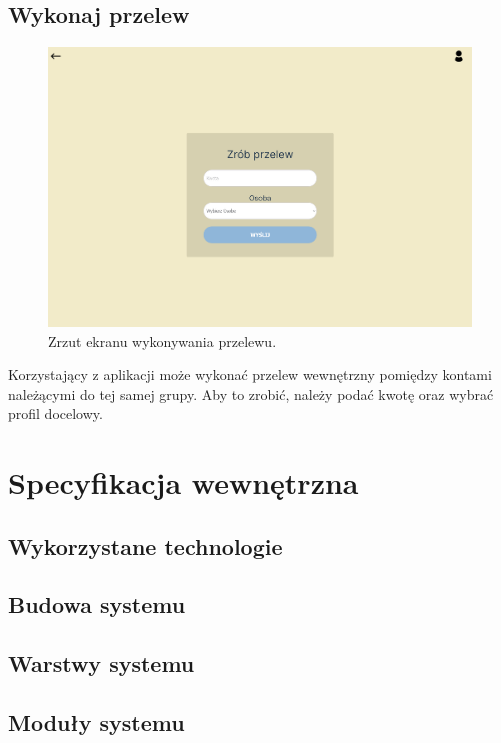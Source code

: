 \documentclass[12pt,a4paper,oneside]{article}
\begin{document}
\subsection{Wykonaj przelew}
\begin{figure}[H]
    \centering
    \includegraphics[width=\hsize,keepaspectratio]{images/make_transfer.png}
    \caption{Zrzut ekranu wykonywania przelewu.}
\end{figure}
Korzystający z aplikacji może wykonać przelew wewnętrzny pomiędzy kontami
należącymi do tej samej grupy. Aby to zrobić, należy podać kwotę oraz wybrać
profil docelowy.

\section{Specyfikacja wewnętrzna}
\subsection{Wykorzystane technologie}

\subsection{Budowa systemu}

\subsection{Warstwy systemu}

\subsection{Moduły systemu}
\end{document}
